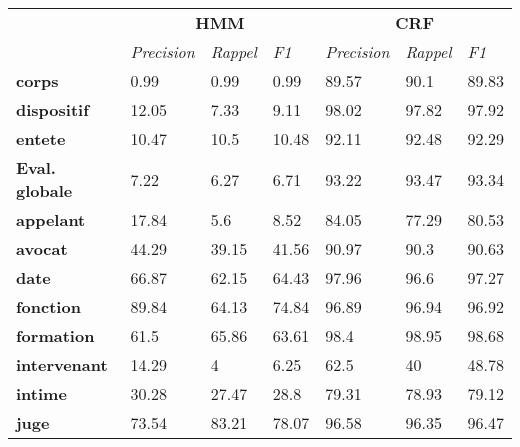 \begin{table}[!h]
	\scriptsize
	\centering
	\begin{tabular}{|l|l|l|l|l|l|l|}
		\hline
	\multirow{2}{*}{}	& \multicolumn{3}{c}{\textbf{HMM}}  &      \multicolumn{3}{|c|}{\textbf{CRF}}          \\ \cline{2-7}
		& \textit{Precision} & \textit{Rappel} & \textit{F1} & \textit{Precision} & \textit{Rappel} & \textit{F1} \\ \hline
		\textbf{corps}         & 0.99               & 0.99            & 0.99        & 89.57              & 90.1            & 89.83       \\ 
		\textbf{dispositif}    & 12.05              & 7.33            & 9.11        & 98.02              & 97.82           & 97.92       \\ 
		\textbf{entete}        & 10.47              & 10.5            & 10.48       & 92.11              & 92.48           & 92.29       \\ \hline
		\textbf{Eval. globale} & 7.22               & 6.27            & 6.71        & 93.22              & 93.47           & 93.34       \\ \hline
				\noalign{\smallskip}\hline\noalign{\smallskip}
		\textbf{appelant}      & 17.84              & 5.6             & 8.52        & 84.05              & 77.29           & 80.53       \\ 
		\textbf{avocat}        & 44.29              & 39.15           & 41.56       & 90.97              & 90.3            & 90.63       \\ 
		\textbf{date}          & 66.87              & 62.15           & 64.43       & 97.96              & 96.6            & 97.27       \\ 
		\textbf{fonction}      & 89.84              & 64.13           & 74.84       & 96.89              & 96.94           & 96.92       \\ 
		\textbf{formation}     & 61.5               & 65.86           & 63.61       & 98.4               & 98.95           & 98.68       \\ 
		\textbf{intervenant}   & 14.29              & 4               & 6.25        & 62.5               & 40              & 48.78       \\ 
		\textbf{intime}        & 30.28              & 27.47           & 28.8        & 79.31              & 78.93           & 79.12       \\ 
		\textbf{juge}          & 73.54              & 83.21           & 78.07       & 96.58              & 96.35           & 96.47       \\ 

\end{tabular}
\end{table}
